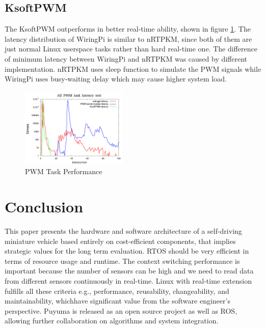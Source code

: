 \documentclass[conference]{IEEEtran}
\begin{document}
\subsection{KsoftPWM}

The KsoftPWM outperforms in better real-time ability, shown in figure \ref{fig:ksoftpwm_perf}. The latency distribution of WiringPi is similar to nRTPKM, since both of them are just normal Linux userspace tasks rather than hard real-time one. The difference of minimum latency between WiringPi and nRTPKM was caused by different implementation. nRTPKM uses sleep function to simulate the PWM signals while WiringPi uses busy-waiting delay which may cause higher system load.

\begin{figure}
	\centering
	\includegraphics[width=2in]{img/ksoftpwm_load.png}
	\caption{PWM Task Performance}
	\label{fig:ksoftpwm_perf}
\end{figure}

\section{Conclusion}

This paper presents the hardware and software architecture of a self-driving miniature vehicle based entirely on cost-efficient components, that implies strategic values for the long term evaluation. RTOS should be very efficient in terms of resource usage and runtime. The context switching performance is important because the number of sensors can be high and we need to read data from different sensors continuously in real-time. Linux with real-time extension  fulfills all these criteria e.g., performance, reusability, changeability, and maintainability, whichhave significant value from the software engineer's perspective. Puyuma is released as an open source project as well as ROS, allowing further collaboration on algorithms and system integration.



\end{document}
